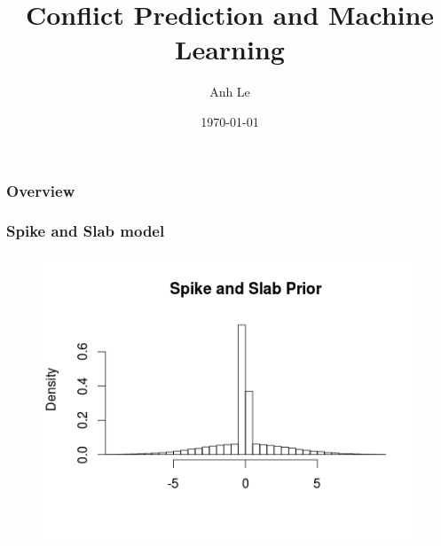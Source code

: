 \documentclass{beamer}
\title[Conflict Prediction]{Conflict Prediction and Machine Learning} %
\author{Anh Le} %
\institute[Duke] %
{
Duke University \\ %
\medskip
\textit{anh.le@duke.edu} %
}
\date{\today} %
\begin{document}
\begin{frame}
\titlepage %
\end{frame}

\begin{frame}
\frametitle{Overview} %
\tableofcontents %
\end{frame}


\begin{frame}
\frametitle{Spike and Slab model}

\begin{figure}
\includegraphics[width=\textwidth]{../image/spike_and_slab}
\end{figure}
\end{frame}

\end{document}
